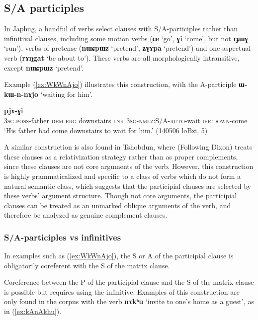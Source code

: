 \documentclass[oldfontcommands,oneside,a4paper,11pt]{article}
\newcommand{\ipa}[1]{\textbf{\phon#1}} %
\newcommand{\jpg}[2]{\ipa{#1} `#2'} %
\begin{document}
 \subsection{S/A participles} \label{sec:SApart}
In Japhug, a handful of verbs select clauses with S/A-participles rather than infinitival clauses, including  some motion verbs (\jpg{ɕe}{go}, \jpg{ɣi}{come}, but not \jpg{rɟɯɣ}{run}), verbs of pretense (\jpg{nɯɕpɯz}{pretend}, \jpg{ʑɣɤpa}{pretend}) and one aspectual verb  (\jpg{rɤŋgat}{be about to}). These verbs are all morphologically intransitive, except \jpg{nɯɕpɯz}{pretend}.

Example (\ref{ex:WkWnAjo}) illustrates this construction, with the A-participle \ipa{ɯ-kɯ-n-nɤjo} `waiting for him'.

\begin{exe}
\ex \label{ex:WkWnAjo}
\gll [\ipa{ɯ-wa} 	\ipa{nɯ} 	\ipa{kɯ} 	\ipa{kʰapa} 	\ipa{tɕe} 	\ipa{ɯ-kɯ-n-nɤjo}] 	\ipa{pjɤ-ɣi} \\
\textsc{3sg.poss}-father \textsc{dem} \textsc{erg} downstairs \textsc{lnk} \textsc{3sg-nmlz:S/A-auto}-wait \textsc{ifr:down}-come \\
\glt `His father had come downstairs to wait for him.' (140506 loBzi, 5)
\end{exe}


A similar construction is also found in Tshobdun, where \citet{sun12complementation} (Following Dixon) treats these clauses as a relativization strategy rather than as proper complements, since these clauses are not core arguments of the verb. However, this construction is highly grammaticalized and specific to a class of verbs which do not form a natural semantic class, which suggests that the participial clauses are selected by these verbs' argument structure. Though not core arguments, the participial clauses can be treated as an unmarked oblique arguments of the verb, and therefore be analyzed as genuine complement clauses.

\subsubsection{S/A-participles vs infinitives}
In examples such as (\ref{ex:WkWnAjo}), the S or A of the participial clause is obligatorily coreferent with the S of the matrix clause.

Coreference between the P of the participial clause and the S of the matrix clause is possible but requires using the infinitive. Examples of this construction are only found in the corpus with the verb \jpg{nɤkʰu}{invite to one's home as a guest}, as in (\ref{ex:kAnAkhu}).
\end{document}
